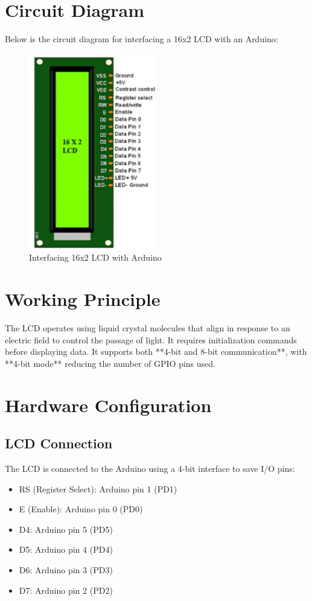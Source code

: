 \documentclass[12pt,a4paper]{article}
\begin{document}
\section{Circuit Diagram}
Below is the circuit diagram for interfacing a 16x2 LCD with an Arduino:\\

\begin{figure}[h]
    \centering
    \includegraphics[width=0.5\textwidth]{LCD display.png} %
    \caption{Interfacing 16x2 LCD with Arduino}
    \label{fig:lcd_circuit}
\end{figure}

\section{Working Principle}
The LCD operates using liquid crystal molecules that align in response to an electric field to control the passage of light. It requires initialization commands before displaying data. It supports both **4-bit and 8-bit communication**, with **4-bit mode** reducing the number of GPIO pins used.
\section{Hardware Configuration}
\subsection{LCD Connection}
The LCD is connected to the Arduino using a 4-bit interface to save I/O pins:
\begin{itemize}
    \item RS (Register Select): Arduino pin 1 (PD1)
    \item E (Enable): Arduino pin 0 (PD0)
    \item D4: Arduino pin 5 (PD5)
    \item D5: Arduino pin 4 (PD4)
    \item D6: Arduino pin 3 (PD3)
    \item D7: Arduino pin 2 (PD2)
\end{itemize}
\end{document}

